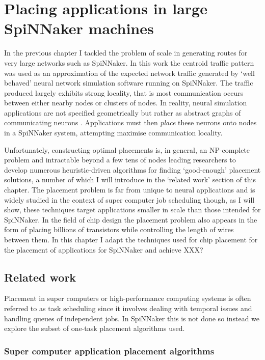 \chapter{Placing applications in large SpiNNaker machines}
	
	In the previous chapter I tackled the problem of scale in generating routes
	for very large networks such as SpiNNaker. In this work the centroid traffic
	pattern was used as an approximation of the expected network traffic
	generated by `well behaved' neural network simulation software running on
	SpiNNaker. The traffic produced largely exhibits strong locality, that is
	most communication occurs between either nearby nodes or clusters of nodes.
	In reality, neural simulation applications are not specified geometrically
	but rather as abstract graphs of communicating neurons
	\cite{davison08,eliasmith13}. Applications must then \emph{place} these
	neurons onto nodes in a SpiNNaker system, attempting maximise communication
	locality.
	
	Unfortunately, constructing optimal placements is, in general, an NP-complete
	problem and intractable beyond a few tens of nodes leading researchers to
	develop numerous heuristic-driven algorithms for finding `good-enough'
	placement solutions, a number of which I will introduce in the `related work'
	section of this chapter. The placement problem is far from unique to neural
	applications and is widely studied in the context of super computer job
	scheduling though, as I will show, these techniques target applications
	smaller in scale than those intended for SpiNNaker. In the field of chip
	design the placement problem also appears in the form of placing billions of
	transistors while controlling the length of wires between them. In this
	chapter I adapt the techniques used for chip placement for the placement of
	applications for SpiNNaker and achieve XXX?
	
	\section{Related work}
		
		Placement in super computers or high-performance computing systems is often
		referred to as task scheduling since it involves dealing with temporal
		issues and handling queues of independent jobs. In SpiNNaker this is not
		done so instead we explore the subset of one-task placement algorithms
		used.
		
		\subsection{Super computer application placement algorithms}
			
